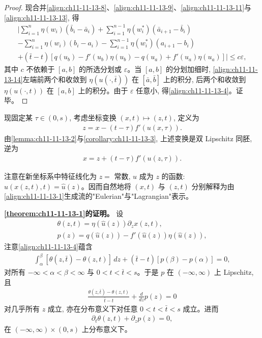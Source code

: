 \documentclass[../../main.tex]{subfiles}
\begin{document}
\begin{proof}
现合并\eqref{align:ch11-11-13-8}、\eqref{align:ch11-11-13-9}、\eqref{align:ch11-11-13-11}与\eqref{align:ch11-11-13-13}, 得
\begin{align}
\biggl|\sum_{i=1}^n\eta(w_i)(\bar b_i-\bar a_i)+\sum_{i=1}^{n-1}\eta(w_i^*)(\bar a_{i+1}-\bar b_i)\nonumber\\
-\sum_{i=1}^n\eta(w_i)(b_i-a_i)-\sum_{i=1}^{n-1}\eta(w_i^*)(a_{i+1}-b_i)\nonumber\\
+(\bar t-t)[q(u_b)-f'(u_b)\eta(u_b)-q(u_a)+f'(u_a)\eta(u_a)]\biggr|\leqslant c\varepsilon,\label{align:ch11-11-13-14}
\end{align}
其中 $c$ 不依赖于 $[a,b]$ 的所选分划或 $\varepsilon$。当 $[a,b]$ 的分划加细时, \eqref{align:ch11-11-13-14}左端前两个和收敛到 $\eta(u(\cdot,\bar t))$ 在 $[\bar a,\bar b]$ 上的积分, 后两个和收敛到 $\eta(u(\cdot,t))$ 在 $[a,b]$ 上的积分。由于 $\varepsilon$ 任意小, 得\eqref{align:ch11-11-13-4}。证毕。
\end{proof}

现固定某 $\tau\in(0,s)$, 考虑坐标变换 $(x,t)\mapsto(z,t)$, 定义为
\begin{align}
z=x-(t-\tau)f'(u(x,\tau)).\label{align:ch11-11-13-15}
\end{align}
由\cref{lemma:ch11-11-13-2}与\cref{corollary:ch11-11-13-3}, 上述变换是双 Lipschitz 同胚, 逆为
\begin{align}
x=z+(t-\tau)f'(u(z,\tau)).\label{align:ch11-11-13-16}
\end{align}

注意在新坐标系中特征线化为 $z=$ 常数, $u$ 成为 $z$ 的函数: $u(x(z,t),t)=\hat u(z)$。因而自然地将 $(x,t)$ 与 $(z,t)$ 分别解释为由\eqref{align:ch11-11-13-1}生成流的"Eulerian"与"Lagrangian"表示。

\textbf{\cref{theorem:ch11-11-13-1}的证明。} 设
\begin{align}
\theta(z,t)=\eta(\hat u(z))\partial_z x(z,t),\label{align:ch11-11-13-17}\\
p(z)=q(\hat u(z))-f'(\hat u(z))\eta(\hat u(z)),\label{align:ch11-11-13-18}
\end{align}
注意\eqref{align:ch11-11-13-4}蕴含
\begin{align}
\int_\alpha^\beta[\theta(z,\bar t)-\theta(z,t)]\,dz+(\bar t-t)[p(\beta)-p(\alpha)]=0,\label{align:ch11-11-13-19}
\end{align}
对所有 $-\infty<\alpha<\beta<\infty$ 与 $0<t<\bar t<s$。于是 $p$ 在 $(-\infty,\infty)$ 上 Lipschitz, 且
\begin{align}
\frac{\theta(z,\bar t)-\theta(z,t)}{\bar t-t}+\frac{d}{dz}p(z)=0\label{align:ch11-11-13-20}
\end{align}
对几乎所有 $z$ 成立, 亦在分布意义下对任意 $0<t<\bar t<s$ 成立。进而
\begin{align}
\partial_t\theta(z,t)+\partial_z p(z)=0,\label{align:ch11-11-13-21}
\end{align}
在 $(-\infty,\infty)\times(0,s)$ 上分布意义下。
\end{document}
